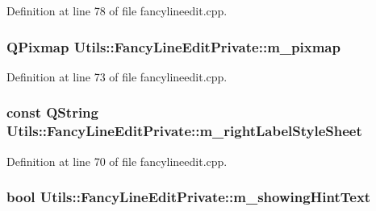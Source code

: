 \-Definition at line 78 of file fancylineedit.\-cpp.

\hypertarget{class_utils_1_1_fancy_line_edit_private_ad8bbe3f232d24f0176ef6754253b8d3a}{
\subsubsection[{m\-\_\-pixmap}]{\setlength{\rightskip}{0pt plus 5cm}\-Q\-Pixmap {\bf \-Utils\-::\-Fancy\-Line\-Edit\-Private\-::m\-\_\-pixmap}}}\label{class_utils_1_1_fancy_line_edit_private_ad8bbe3f232d24f0176ef6754253b8d3a}


\-Definition at line 73 of file fancylineedit.\-cpp.

\hypertarget{class_utils_1_1_fancy_line_edit_private_a72ea68074cff6c0179e513bc1c92bcd3}{
\subsubsection[{m\-\_\-right\-Label\-Style\-Sheet}]{\setlength{\rightskip}{0pt plus 5cm}const {\bf \-Q\-String} {\bf \-Utils\-::\-Fancy\-Line\-Edit\-Private\-::m\-\_\-right\-Label\-Style\-Sheet}}}\label{class_utils_1_1_fancy_line_edit_private_a72ea68074cff6c0179e513bc1c92bcd3}


\-Definition at line 70 of file fancylineedit.\-cpp.

\hypertarget{class_utils_1_1_fancy_line_edit_private_a283cbbdaa3d8a3b4a2a422e1000f76b0}{
\subsubsection[{m\-\_\-showing\-Hint\-Text}]{\setlength{\rightskip}{0pt plus 5cm}bool {\bf \-Utils\-::\-Fancy\-Line\-Edit\-Private\-::m\-\_\-showing\-Hint\-Text}}}\label{class_utils_1_1_fancy_line_edit_private_a283cbbdaa3d8a3b4a2a422e1000f76b0}



